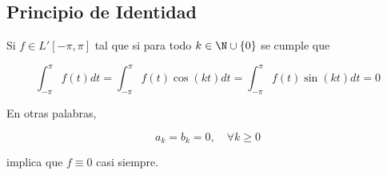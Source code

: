 \subsection*{Principio de Identidad}

\begin{teo}
    Si $f \in L'[-\pi, \pi]$ tal que si para todo $k \in \N \cup \{ 0 \}$ se cumple que

    \[
        \int_{-\pi}^{\pi} f(t)dt = \int_{-\pi}^{\pi} f(t)\cos(kt)dt = \int_{-\pi}^{\pi} f(t)\sin(kt)dt = 0
    \]

    En otras palabras,

    \[
        a_k = b_k = 0, \quad \forall k \geq 0
    \]

    implica que $f \equiv 0$ casi siempre.
\end{teo}

